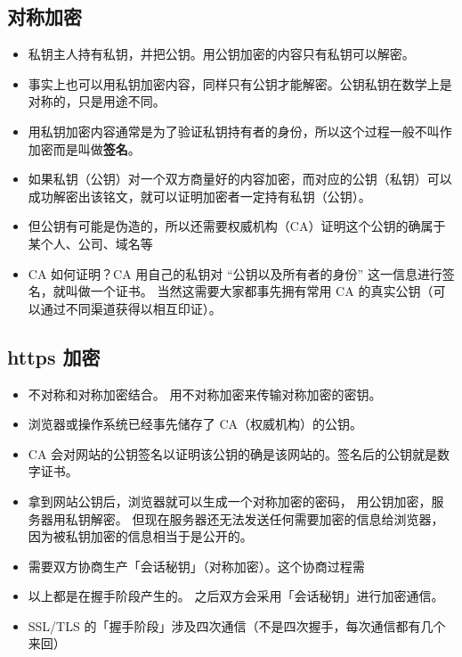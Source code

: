 
\subsection{对称加密}
\begin{itemize}
\item 私钥主人持有私钥，并把公钥。用公钥加密的内容只有私钥可以解密。
\item 事实上也可以用私钥加密内容，同样只有公钥才能解密。公钥私钥在数学上是对称的，只是用途不同。
\item 用私钥加密内容通常是为了验证私钥持有者的身份，所以这个过程一般不叫作加密而是叫做\textbf{签名}。
\item 如果私钥（公钥）对一个双方商量好的内容加密，而对应的公钥（私钥）可以成功解密出该铭文，就可以证明加密者一定持有私钥（公钥）。
\item 但公钥有可能是伪造的，所以还需要权威机构（CA）证明这个公钥的确属于某个人、公司、域名等
\item CA 如何证明？CA 用自己的私钥对 “公钥以及所有者的身份” 这一信息进行签名，就叫做一个证书。 当然这需要大家都事先拥有常用 CA 的真实公钥（可以通过不同渠道获得以相互印证）。
\end{itemize}

\subsection{https 加密}
\begin{itemize}
\item 不对称和对称加密结合。 用不对称加密来传输对称加密的密钥。
\item 浏览器或操作系统已经事先储存了 CA（权威机构）的公钥。
\item CA 会对网站的公钥签名以证明该公钥的确是该网站的。签名后的公钥就是数字证书。
\item 拿到网站公钥后，浏览器就可以生成一个对称加密的密码， 用公钥加密，服务器用私钥解密。 但现在服务器还无法发送任何需要加密的信息给浏览器，因为被私钥加密的信息相当于是公开的。
\item 需要双方协商生产「会话秘钥」（对称加密）。这个协商过程需
\item 以上都是在握手阶段产生的。 之后双方会采用「会话秘钥」进行加密通信。
\item SSL/TLS 的「握手阶段」涉及四次通信（不是四次握手，每次通信都有几个来回）
\end{itemize}
